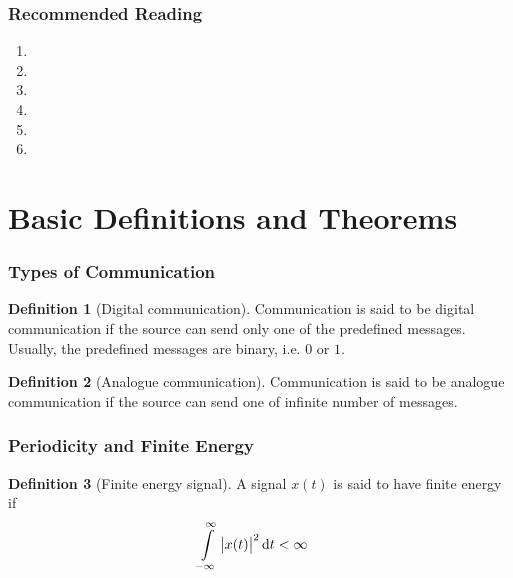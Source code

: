 \documentclass[titlepage, fleqn, a4paper, 12pt, twoside]{article}
\theoremstyle{definition}
\newtheorem{definition}{Definition}
\theoremstyle{theorem}
\begin{document}
\section{Recommended Reading}

\begin{enumerate}
	\item {}
	\item {}
	\item {}
	\item {}
	\item {}
	\item {}
\end{enumerate}

\clearpage
{}

\part{Basic Definitions and Theorems}

\section{Types of Communication}

\begin{definition}[Digital communication]
	Communication is said to be digital communication if the source can send only one of the predefined messages.
	Usually, the predefined messages are binary, i.e. $0$ or $1$.
	\label{def:digital_communication}
\end{definition}

\begin{definition}[Analogue communication]
	Communication is said to be analogue communication if the source can send one of infinite number of messages.
	\label{def:analogue_communication}
\end{definition}

\section{Periodicity and Finite Energy}

\begin{definition}[Finite energy signal]
	A signal $x(t)$ is said to have finite energy if
	\begin{align*}
		\int\limits_{-\infty}^{\infty} \left| x(t) \right|^2 \dif t &< \infty
	\end{align*}
	\label{def:finite_energy_signal}
\end{definition}
\end{document}
